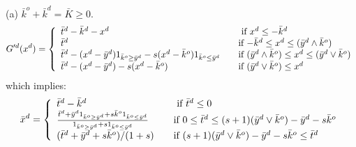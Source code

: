 \documentclass[mnsc,nonblindrev,copyedit]{informs2_wz} %
\begin{document}
\noindent (a) $\bar{k}^o + \bar{k}^d = \bar{K} \geq 0$.
\begin{equation} G'^d(x^d) = \left\{
  \begin{array} {ll}
  \bar{t}^d -\bar{k}^d -x^d  \quad & \mbox{ if $x^d \leq -\bar{k}^d
  $} \\
\bar{t}^d  \quad  & \mbox{if $-\bar{k}^d \leq x^d \leq
(\bar{y}^d\wedge
\bar{k}^o) $} \\
\bar{t}^d  -(x^d - \bar{y}^d)1_{\bar{k}^o \geq \bar{y}^d}-s(x^d -
\bar{k}^o)1_{\bar{k}^o \leq \bar{y}^d} \quad  & \mbox{if $
(\bar{y}^d\wedge
\bar{k}^o) \leq x^d \leq (\bar{y}^d \vee \bar{k}^o)   $}\\
\bar{t}^d  -(x^d - \bar{y}^d)-s(x^d - \bar{k}^o) \quad  & \mbox{if
$(\bar{y}^d\vee \bar{k}^o) \leq x^d$}
  \end{array} \right.
\end{equation}
which implies:
\begin{equation}
\bar{x}^d = \left\{
  \begin{array} {ll}
  \bar{t}^d -\bar{k}^d \quad & \mbox{ if $\bar{t}^d \leq 0$} \\
\frac{\bar{t}^d  + \bar{y}^d1_{\bar{k}^o \geq
\bar{y}^d}+s\bar{k}^o1_{\bar{k}^o \leq \bar{y}^d}}{1_{\bar{k}^o
\geq \bar{y}^d}+s1_{\bar{k}^o \leq \bar{y}^d}} \quad  & \mbox{if
$0 \leq \bar{t}^d \leq (s+1)(\bar{y}^d\vee \bar{k}^o)-\bar{y}^d -
s\bar{k}^o
$}\\
(\bar{t}^d  + \bar{y}^d+s\bar{k}^o)/(1+s) \quad  & \mbox{if $
(s+1)(\bar{y}^d\vee \bar{k}^o)-\bar{y}^d - s\bar{k}^o \leq
\bar{t}^d $}
  \end{array} \right.  \label{eqn:barXd1}
\end{equation}
\end{document}
